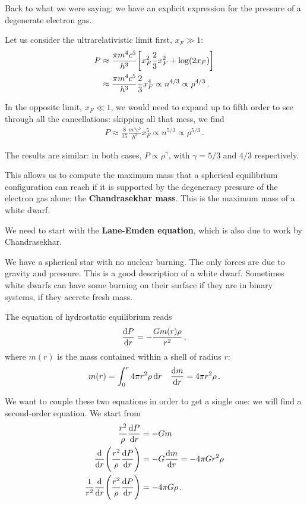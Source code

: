 \documentclass[main.tex]{subfiles}
\begin{document}

Back to what we were saying: we have an explicit expression for the pressure of a degenerate electron gas. 

Let us consider the ultrarelativistic limit first, \(x_F \gg 1\): 
%
\begin{align}
P &\approx \frac{\pi m^4 c^{5}}{h^3}
\qty[x_F^2 \frac{2}{3} x_F^2 + \log (2 x_F)]  \\
&\approx \frac{\pi m^4 c^{5}}{h^3} \frac{2}{3} x_F^{4} \propto n^{4/3} \propto \rho^{4/3}
\,.
\end{align}

In the opposite limit, \(x_F \ll 1\), we would need to expand up to fifth order to see through all the cancellations: skipping all that mess, we find
%
\begin{align}
P \approx \frac{8}{15} \frac{m^4 c^5}{h^3} x_F^{5} \propto n^{5/3}  \propto \rho^{5/3}
\,.
\end{align}

The results are similar: in both cases, \(P \propto \rho^{\gamma }\), with \(\gamma = 5/3\) and \(4/3\) respectively.

This allows us to compute the maximum mass that a spherical equilibrium configuration can reach if it is supported by the degeneracy pressure of the electron gas alone: the \textbf{Chandrasekhar mass}.
This is the maximum mass of a white dwarf. 

We need to start with the \textbf{Lane-Emden equation}, which is also due to work by Chandrasekhar. 

We have a spherical star with no nuclear burning. 
The only forces are due to gravity and pressure. This is a good description of a white dwarf. 
Sometimes white dwarfs can have some burning on their surface if they are in binary systems, if they accrete fresh mass. 

The equation of hydrostatic equilibrium reads 
%
\begin{align}
\dv{P}{r} = - \frac{G m(r) \rho }{r^2}
\,,
\end{align}
%
where \(m(r)\) is the mass contained within a shell of radius \(r\):
%
\begin{align}
m(r) = \int_0^{r} 4 \pi r^2 \rho \dd{r} 
&& 
\dv{m}{r} = 4 \pi r^2 \rho 
\,.
\end{align}

We want to couple these two equations in order to get a single one: we will find a second-order equation. 
We start from 
%
\begin{align}
\frac{r^2}{\rho }\dv{P}{r} &= - G m  \\
\dv{}{r} \qty(\frac{r^2}{\rho }\dv{P}{r}) &=
- G \dv{m}{r} = - 4 \pi G r^2 \rho  \\
\frac{1}{r^2} \dv{}{r} \qty( \frac{r^2}{\rho } \dv{P}{r}) &= - 4 \pi G \rho 
\,.
\end{align}
\end{document}

